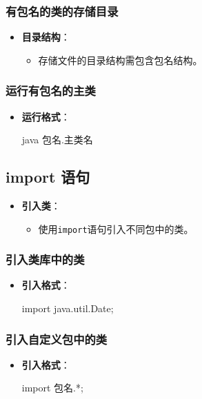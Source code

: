 \documentclass[a4paper, 10pt]{ctexart}
\begin{document}
\subsubsection{有包名的类的存储目录}
\begin{itemize}
  \item \textbf{目录结构}：
  \begin{itemize}
    \item 存储文件的目录结构需包含包名结构。
  \end{itemize}
\end{itemize}

\subsubsection{运行有包名的主类}
\begin{itemize}
  \item \textbf{运行格式}：
  \begin{codeblock}
java 包名.主类名
  \end{codeblock}
\end{itemize}

\subsection{import 语句}
\begin{itemize}
  \item \textbf{引入类}：
  \begin{itemize}
    \item 使用\texttt{import}语句引入不同包中的类。
  \end{itemize}
\end{itemize}

\subsubsection{引入类库中的类}
\begin{itemize}
  \item \textbf{引入格式}：
  \begin{codeblock}
import java.util.Date;
  \end{codeblock}
\end{itemize}

\subsubsection{引入自定义包中的类}
\begin{itemize}
  \item \textbf{引入格式}：
  \begin{codeblock}
import 包名.*;
  \end{codeblock}
\end{itemize}
\end{document}
